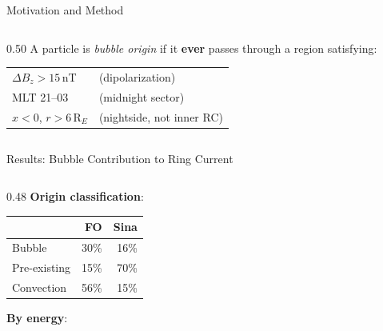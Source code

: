 \documentclass[aspectratio=169,11pt]{beamer}
\begin{document}
\begin{frame}{Motivation and Method}
\begin{columns}[T]
\begin{column}{0.50\textwidth}
A particle is \textit{bubble origin} if it \textbf{ever} passes through a region satisfying:

\vspace{2pt}
\begin{tabular}{@{}ll@{}}
$\Delta B_z > 15$\,nT & (dipolarization) \\
MLT 21--03 & (midnight sector) \\
$x < 0$, $r > 6$\,R$_E$ & (nightside, not inner RC) \\
\end{tabular}
\end{column}
\end{columns}
\end{frame}

\begin{frame}{Results: Bubble Contribution to Ring Current}

\begin{columns}[T]
\begin{column}{0.48\textwidth}
\footnotesize
\textbf{Origin classification}:

\vspace{4pt}
\begin{tabular}{@{}lrr@{}}
\toprule
 & \textbf{FO} & \textbf{Sina} \\
\midrule
Bubble & 30\% & 16\% \\
Pre-existing & 15\% & 70\% \\
Convection & 56\% & 15\% \\
\bottomrule
\end{tabular}

\vspace{6pt}
\textbf{By energy}:


\end{column}
\end{columns}
\end{frame}
\end{document}
